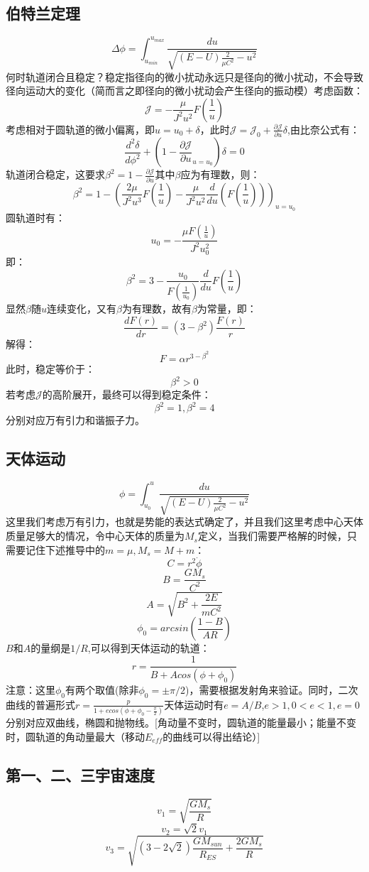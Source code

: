 \documentclass[a4paper, 10pt, openany]{book}%
\begin{document}
    \subsection{伯特兰定理}
     $$\Delta \phi=\int_{u_{min}}^{u_{max}}\frac{du}{\sqrt{(E-U)\frac{2}{\mu C^2}-u^2}}$$
    何时轨道闭合且稳定？稳定指径向的微小扰动永远只是径向的微小扰动，不会导致径向运动大的变化（简而言之即径向的微小扰动会产生径向的振动模）考虑函数：
    $$\mathcal{J}=-\frac{\mu}{J^2u^2}F(\frac{1}{u})$$
    考虑相对于圆轨道的微小偏离，即$u=u_0+\delta$，此时$\mathcal{J}=\mathcal{J}_0+\frac{\partial \mathcal{J}}{\partial u}\delta$,由比奈公式有：
    $$\frac{d^2\delta}{d\phi^2}+(1-\frac{\partial \mathcal{J}}{\partial u}_{u=u_0})\delta=0$$
    轨道闭合稳定，这要求$\beta^2=1-\frac{\partial \mathcal{J}}{\partial u}$其中$\beta$应为有理数，则：
    $$\beta^2=1-(\frac{2\mu}{J^2u^3}F(\frac{1}{u})-\frac{\mu}{J^2u^2}\frac{d}{du}(F(\frac{1}{u})))_{u=u_0}$$
    圆轨道时有：
    $$u_0=-\frac{\mu F(\frac{1}{u})}{J^2u^2_0}$$
    即：
    $$\beta^2=3-\frac{u_0}{F(\frac{1}{u_0})}\frac{d}{du}F(\frac{1}{u})$$
    显然$\beta$随$u$连续变化，又有$\beta$为有理数，故有$\beta$为常量，即：
    $$\frac{dF(r)}{dr}=(3-\beta^2)\frac{F(r)}{r}$$
    解得：
    $$F=\alpha r^{3-\beta^2}$$
    此时，稳定等价于：
    $$\beta^2>0$$
    若考虑$\mathcal{J}$的高阶展开，最终可以得到稳定条件：
    $$\beta^2=1,\beta^2=4$$
    分别对应万有引力和谐振子力。
    \subsection{天体运动}
    $$\phi=\int_{u_0}^{u}\frac{du}{\sqrt{(E-U)\frac{2}{\mu C^2}-u^2}}$$
    这里我们考虑万有引力，也就是势能的表达式确定了，并且我们这里考虑中心天体质量足够大的情况，令中心天体的质量为$M_s$定义，当我们需要严格解的时候，只需要记住下述推导中的$m=\mu,M_s=M+m$：
    $$C=r^2\dot{\phi}$$
    $$B=\frac{GM_s}{C^2}$$
    $$A=\sqrt{B^2+\frac{2E}{mC^2}}$$
    $$\phi_0=arcsin(\frac{1-B}{AR})$$
    $B$和$A$的量纲是$1/R$,可以得到天体运动的轨道：
    $$r=\frac{1}{B+Acos(\phi+\phi_0)}$$
    注意：这里$\phi_0$有两个取值(除非$\phi_0=\pm\pi/2$)，需要根据发射角来验证。同时，二次曲线的普遍形式$r=\frac{p}{1+ecos({\phi+\phi_0-\frac{\pi}{2}})}$天体运动时有$e=A/B$,$e>1,0<e<1,e=0$分别对应双曲线，椭圆和抛物线。[角动量不变时，圆轨道的能量最小；能量不变时，圆轨道的角动量最大（移动$E_{eff}$的曲线可以得出结论）]
    \subsection{第一、二、三宇宙速度}
    $$v_1=\sqrt{\frac{GM_s}{R}}$$
    $$v_2=\sqrt{2}v_1$$
    $$v_3=\sqrt{(3-2\sqrt{2})\frac{GM_{sun}}{R_{ES}}+\frac{2GM_s}{R}}$$
\end{document}
